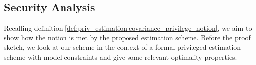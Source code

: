

% 
% 

\subsection{Security Analysis}\label{subsec:priv_estimation:est_security}
Recalling definition \ref{def:priv_estimation:covariance_privilege_notion}, we aim to show how the notion is met by the proposed estimation scheme. Before the proof sketch, we look at our scheme in the context of a formal privileged estimation scheme with model constraints and give some relevant optimality properties.

